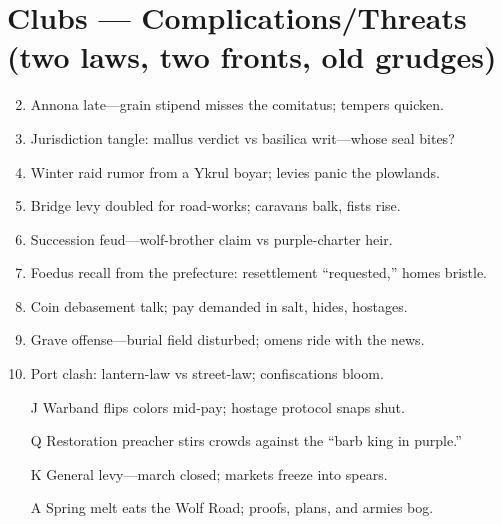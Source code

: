 \section*{Clubs --- Complications/Threats (two laws, two fronts, old grudges)}
\begin{enumerate}
\setcounter{enumi}{1}
\item Annona late---grain stipend misses the comitatus; tempers quicken.
\item Jurisdiction tangle: mallus verdict vs basilica writ---whose seal bites?
\item Winter raid rumor from a Ykrul boyar; levies panic the plowlands.
\item Bridge levy doubled for road-works; caravans balk, fists rise.
\item Succession feud---wolf-brother claim vs purple-charter heir.
\item Foedus recall from the prefecture: resettlement ``requested,'' homes bristle.
\item Coin debasement talk; pay demanded in salt, hides, hostages.
\item Grave offense---burial field disturbed; omens ride with the news.
\item Port clash: lantern-law vs street-law; confiscations bloom.
\item[J] Warband flips colors mid-pay; hostage protocol snaps shut.
\item[Q] Restoration preacher stirs crowds against the ``barb king in purple.''
\item[K] General levy---march closed; markets freeze into spears.
\item[A] Spring melt eats the Wolf Road; proofs, plans, and armies bog.
\end{enumerate}


